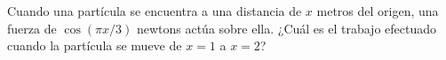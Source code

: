 \item Cuando una partícula se encuentra a una distancia de $x$ metros del origen, una fuerza de $\cos(\pi x / 3)$ newtons actúa sobre ella. ¿Cuál es el trabajo efectuado cuando la partícula se mueve de $x = 1$ a $x = 2$?
